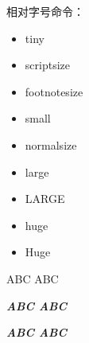 \documentclass[twoside]{ctexart}
\begin{document}

           
            相对字号命令：
            \begin{itemize}
                \item {\tiny tiny} 
                \item {\scriptsize scriptsize}
                \item {\footnotesize footnotesize}
                \item {\small small}
                \item {\normalsize normalsize} 
                \item {\large large}
                \item {\LARGE LARGE}
                \item {\huge huge}
                \item {\Huge Huge}
            \end{itemize}
        
            ABC ABC

            {\sffamily\large\bfseries\itshape ABC \normalfont ABC}
            
            {\sffamily\large\bfseries\itshape ABC \normalsize ABC}
            
\end{document}
